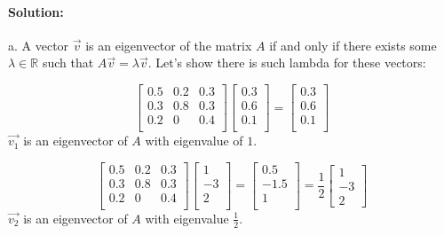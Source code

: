 \documentclass[12pt, letterpaper]{article}
\newcommand{\R}{\mathbb{R}}
\theoremstyle{statement}
\theoremstyle{statement}
\newenvironment{Solution}{\noindent\ignorespaces\paragraph{Solution:}}{\hfill \ding{122}\par\noindent}
\begin{document}
    \begin{Solution}
    a. A vector $\vec{v}$ is an eigenvector of the matrix $A$ if and only if there exists some $\lambda\in\R$ such that $A\vec{v}=\lambda\vec{v}$. Let's show there is such lambda for these vectors:
    
    $$
    \begin{bmatrix}
    0.5 & 0.2 & 0.3 \\
    0.3 & 0.8 & 0.3 \\
    0.2 &   0 & 0.4 \\
    \end{bmatrix}
    \begin{bmatrix}
    0.3 \\
    0.6 \\
    0.1 \\
    \end{bmatrix}
    =
    \begin{bmatrix}
    0.3 \\
    0.6 \\
    0.1 \\
    \end{bmatrix}
    $$
    $\vec{v_1}$ is an eigenvector of $A$ with eigenvalue of $1$.
    
    $$
    \begin{bmatrix}
    0.5 & 0.2 & 0.3 \\
    0.3 & 0.8 & 0.3 \\
    0.2 &   0 & 0.4 \\
    \end{bmatrix}
    \begin{bmatrix}
    1 \\
    -3 \\
    2 \\
    \end{bmatrix}
    =
    \begin{bmatrix}
    0.5 \\
    -1.5 \\
    1 \\
    \end{bmatrix}
    = \frac{1}{2}
    \begin{bmatrix}
    1 \\
    -3 \\
    2
    \end{bmatrix}
    $$
    $\vec{v_2}$ is an eigenvector of $A$ with eigenvalue $\frac{1}{2}$.
    

\end{Solution}
\end{document}
